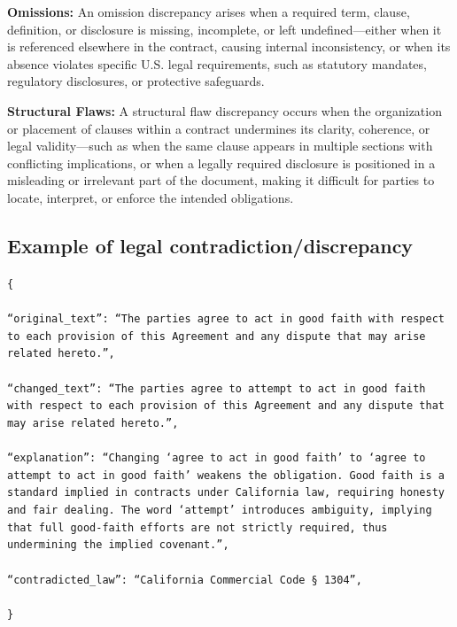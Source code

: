 \documentclass[11pt]{article}
\begin{document}
\begin{tcolorbox}[breakable,colback=lightestgray,colframe=black,title=\textbf{Eval\_3 L2: Legal Discrepancy Detection Prompt}]
\textbf{Omissions:}
An omission discrepancy arises when a required term, clause, definition, or disclosure is missing, incomplete, or left undefined—either when it is referenced elsewhere in the contract, causing internal inconsistency, or when its absence violates specific U.S. legal requirements, such as statutory mandates, regulatory disclosures, or protective safeguards.

\textbf{Structural Flaws:}
A structural flaw discrepancy occurs when the organization or placement of clauses within a contract undermines its clarity, coherence, or legal validity—such as when the same clause appears in multiple sections with conflicting implications, or when a legally required disclosure is positioned in a misleading or irrelevant part of the document, making it difficult for parties to locate, interpret, or enforce the intended obligations.

\subsection*{\textbf{Example of legal contradiction/discrepancy}}

{\footnotesize
\texttt{\{\\\\
``original\_text'': ``The parties agree to act in good faith with respect to each provision of this Agreement and any dispute that may arise related hereto.'',\\\\
``changed\_text'': ``The parties agree to attempt to act in good faith with respect to each provision of this Agreement and any dispute that may arise related hereto.'',\\\\
``explanation'': ``Changing `agree to act in good faith' to `agree to attempt to act in good faith' weakens the obligation. Good faith is a standard implied in contracts under California law, requiring honesty and fair dealing. The word `attempt' introduces ambiguity, implying that full good-faith efforts are not strictly required, thus undermining the implied covenant.'',\\\\
``contradicted\_law'': ``California Commercial Code § 1304'',\\\\
\}}
}


\end{tcolorbox}
\end{document}
